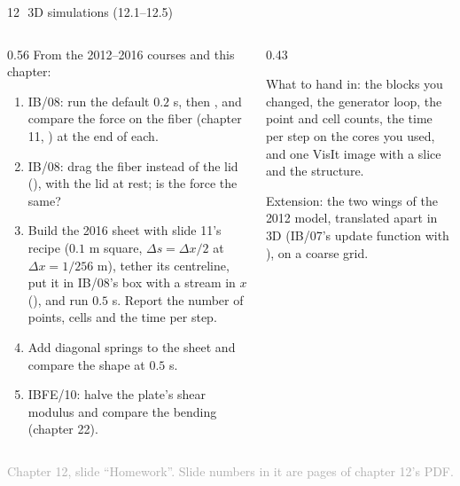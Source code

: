 \documentclass[aspectratio=169,11pt]{beamer}
\newcommand{\sourcecredit}[1]{\vfill\begin{flushright}\tiny\textcolor{DarkGray}{#1}\end{flushright}}
\begin{document}
\begin{frame}{12\,\textbullet\ 3D simulations (12.1--12.5)}
\label{fr:c12x1}
\begin{columns}[T,onlytextwidth]
\begin{column}{0.56\textwidth}
\footnotesize From the 2012--2016 courses and this chapter:
\begin{enumerate}
  \item[12.1] IB/08: run the default $0.2$ s, then , and compare the force on the fiber (chapter 11, ) at the end of each.
  \item[12.2] IB/08: drag the fiber instead of the lid (), with the lid at rest; is the force the same?
  \item[12.3] Build the 2016 sheet with slide 11's recipe ($0.1$ m square, $\Delta s = \Delta x/2$ at $\Delta x = 1/256$ m), tether its centreline, put it in IB/08's box with a stream in $x$ (), and run $0.5$ s. Report the number of points, cells and the time per step.
  \item[12.4] Add diagonal springs to the sheet and compare the shape at $0.5$ s.
  \item[12.5] IBFE/10: halve the plate's shear modulus and compare the bending (chapter 22).
\end{enumerate}
\end{column}
\begin{column}{0.43\textwidth}
\begin{punchbox}
\scriptsize What to hand in: the  blocks you changed, the generator loop, the point and cell counts, the time per step on the cores you used, and one VisIt image with a slice and the structure.
\end{punchbox}
\scriptsize {} Extension: the two wings of the 2012 model, translated apart in 3D (IB/07's update function with ), on a coarse grid.
\end{column}
\end{columns}
\sourcecredit{Chapter 12, slide ``Homework''. Slide numbers in it are pages of chapter 12's PDF.}
\end{frame}
\end{document}
